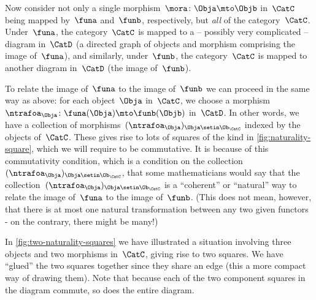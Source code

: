 Now consider not only a single morphism~$\mora \colon \Obja \mto \Objb$ in~$\CatC$ being mapped by~$\funa$ and~$\funb$, respectively, but \emph{all} of the category~$\CatC$.
Under~$\funa$, the category~$\CatC$ is mapped to a -- possibly very complicated --  diagram in~$\CatD$ (a directed graph of objects and morphism comprising the image of~$\funa$), and similarly, under~$\funb$, the category~$\CatC$ is mapped to another diagram in~$\CatD$ (the image of~$\funb$).

To relate the image of~$\funa$ to the image of~$\funb$ we can proceed in the same way as above: for each object~$\Obja$ in~$\CatC$, we choose a morphism~$\ntrafoa_\Obja \colon \funa(\Obja) \mto \funb(\Objb)$ in~$\CatD$.
In other words, we have a collection of morphisms~$(\ntrafoa_\Obja)_{\Obja \setin \Ob_\CatC}$ indexed by the objects of~$\CatC$.
These gives rise to lots of squares of the kind in \cref{fig:naturality-square}, which we will require to be commutative.
It is because of this commutativity condition, which is a condition on the collection~$(\ntrafoa_\Obja)_{\Obja \setin \Ob_\CatC}$, that some mathematicians would say that the collection~$(\ntrafoa_\Obja)_{\Obja \setin \Ob_\CatC}$ is a ``coherent'' or ``natural'' way to relate the image of~$\funa$ to the image of~$\funb$.
(This does not mean, however, that there is at most one natural transformation between any two given functors - on the contrary, there might be many!)

In \cref{fig:two-naturality-squares} we have illustrated a situation involving three objects and two morphisms in~$\CatC$, giving rise to two squares.
We have ``glued'' the two squares together since they share an edge (this a more compact way of drawing them).
Note that because each of the two component squares in the diagram commute, so does the entire diagram.

%
\begin{marginfigure}
    \centering
    \caption{}
    \label{fig:two-naturality-squares}
\end{marginfigure}
%

\


